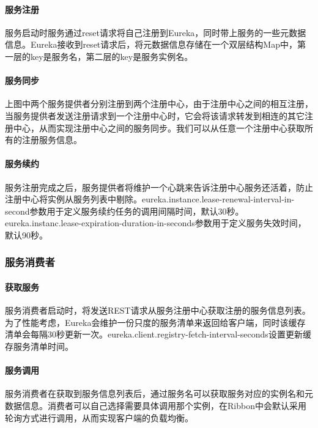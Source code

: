 \documentclass[letterpaper,10pt,english]{sphinxmanual}
\begin{document}
\paragraph{服务注册}
\label{\detokenize{01.spring-cloud/02.eureka/eureka_03:id3}}
服务启动时服务通过reset请求将自己注册到Eureka，同时带上服务的一些元数据信息。Eureka接收到reset请求后，将元数据信息存储在一个双层结构Map中，第一层的key是服务名，第二层的key是服务实例名。


\paragraph{服务同步}
\label{\detokenize{01.spring-cloud/02.eureka/eureka_03:id4}}
上图中两个服务提供者分别注册到两个注册中心，由于注册中心之间的相互注册，当服务提供者发送注册请求到一个注册中心时，它会将该请求转发到相连的其它注册中心，从而实现注册中心之间的服务同步。我们可以从任意一个注册中心获取所有的注册服务信息。


\paragraph{服务续约}
\label{\detokenize{01.spring-cloud/02.eureka/eureka_03:id5}}
服务注册完成之后，服务提供者将维护一个心跳来告诉注册中心服务还活着，防止注册中心将实例从服务列表中剔除。eureka.instance.lease-renewal-interval-in-second参数用于定义服务续约任务的调用间隔时间，默认30秒。eureka.instanc.lease-expiration-duration-in-seconds参数用于定义服务失效时间，默认90秒。


\subsubsection{服务消费者}
\label{\detokenize{01.spring-cloud/02.eureka/eureka_03:id6}}

\paragraph{获取服务}
\label{\detokenize{01.spring-cloud/02.eureka/eureka_03:id7}}
服务消费者启动时，将发送REST请求从服务注册中心获取注册的服务信息列表。为了性能考虑，Eureka会维护一份只度的服务清单来返回给客户端，同时该缓存清单会每隔30秒更新一次。eureka.client.registry-fetch-interval-seconds设置更新缓存服务清单时间。


\paragraph{服务调用}
\label{\detokenize{01.spring-cloud/02.eureka/eureka_03:id8}}
服务消费者在获取到服务信息列表后，通过服务名可以获取服务对应的实例名和元数据信息。消费者可以自己选择需要具体调用那个实例，在Ribbon中会默认采用轮询方式进行调用，从而实现客户端的负载均衡。
\end{document}
